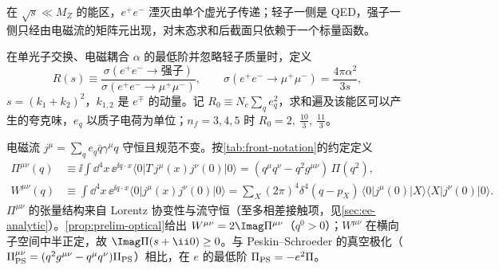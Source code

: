 在 $\sqrt s\ll M_Z$ 的能区，$e^+e^-$ 湮灭由单个虚光子传递；轻子一侧是 QED，强子一侧只经由电磁流的矩阵元出现，对末态求和后截面只依赖于一个标量函数。

\begin{definition}[$R$ 比]\label{def:ee-R}
在单光子交换、电磁耦合 $\alpha$ 的最低阶并忽略轻子质量时，定义
\begin{equation}\label{eq:ee-Rdef}
R(s)\equiv\frac{\sigma(e^+e^-\to\text{强子})}{\sigma(e^+e^-\to\mu^+\mu^-)},\qquad
\sigma(e^+e^-\to\mu^+\mu^-)=\frac{4\pi\alpha^2}{3s},
\end{equation}
$s=(k_1+k_2)^2$，$k_{1,2}$ 是 $e^\mp$ 的动量。记 $R_0\equiv N_c\sum_qe_q^2$，求和遍及该能区可以产生的夸克味，$e_q$ 以质子电荷为单位；$n_f=3,4,5$ 时 $R_0=2,\ \frac{10}3,\ \frac{11}3$。%
\end{definition}

电磁流 $j^\mu=\sum_qe_q\bar q\gamma^\mu q$ 守恒且规范不变。按\cref{tab:front-notation}的约定定义%
\begin{align}
\Pi^{\mu\nu}(q)&\equiv\ii\!\int\!\dd^4x\,\ee^{\ii q\cdot x}\langle0|T\,j^\mu(x)j^\nu(0)|0\rangle=(q^\mu q^\nu-q^2g^{\mu\nu})\,\Pi(q^2), \label{eq:ee-Pidef}\\
W^{\mu\nu}(q)&\equiv\int\!\dd^4x\,\ee^{\ii q\cdot x}\langle0|j^\mu(x)j^\nu(0)|0\rangle
=\sum_X(2\pi)^4\delta^4(q-p_X)\,\langle0|j^\mu(0)|X\rangle\langle X|j^\nu(0)|0\rangle . \label{eq:ee-Wdef}
\end{align}
$\Pi^{\mu\nu}$ 的张量结构来自 Lorentz 协变性与流守恒（至多相差接触项，见\allowbreak\cref{sec:ee-analytic}）。\cref{prop:prelim-optical}给出 $W^{\mu\nu}=2\Imag\Pi^{\mu\nu}$（$q^0>0$）；$W^{\mu\nu}$ 在横向子空间中半正定，故 $\Imag\Pi(s+\ii0)\ge0$。与 Peskin--Schroeder 的真空极化（$\Pi^{\mu\nu}_{\rm PS}=(q^2g^{\mu\nu}-q^\mu q^\nu)\Pi_{\rm PS}$）相比，在 $e$ 的最低阶 $\Pi_{\rm PS}=-e^2\Pi$。

